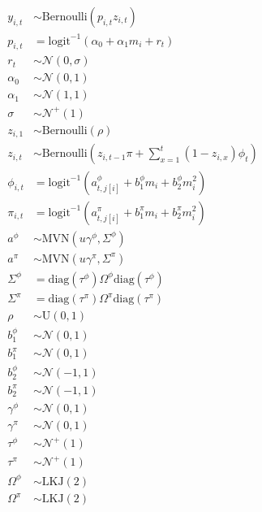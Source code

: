 \documentclass[12pt,letterpaper]{article}
\begin{document}
\begin{equation}
  \begin{aligned}
    y_{i, t} &\sim \text{Bernoulli}(p_{i, t} z_{i, t}) \\
    p_{i, t} &= \text{logit}^{-1}(\alpha_{0} + \alpha_{1} m_{i} + r_{t}) \\ 
    r_{t} &\sim \mathcal{N}(0, \sigma) \\
    \alpha_{0} &\sim \mathcal{N}(0, 1) \\
    \alpha_{1} &\sim \mathcal{N}(1, 1) \\
    \sigma &\sim \mathcal{N}^{+}(1) \\
    z_{i, 1} &\sim \text{Bernoulli}(\rho) \\
    z_{i, t} &\sim \text{Bernoulli}\left(z_{i, t - 1} \pi + \sum_{x = 1}^{t}(1 - z_{i, x}) \phi_{t}\right) \\
    \phi_{i, t} &= \text{logit}^{-1}(a^{\phi}_{t, j[i]} + b^{\phi}_{1} m_{i} + b^{\phi}_{2} m_{i}^{2}) \\
    \pi_{i, t} &= \text{logit}^{-1}(a^{\pi}_{t, j[i]} + b^{\pi}_{1} m_{i} + b^{\pi}_{2} m_{i}^{2}) \\
    a^{\phi} &\sim \text{MVN}(u \gamma^{\phi}, \Sigma^{\phi}) \\
    a^{\pi} &\sim \text{MVN}(u \gamma^{\pi}, \Sigma^{\pi}) \\
    \Sigma^{\phi} &= \text{diag}(\tau^{\phi}) \Omega^{\phi} \text{diag}(\tau^{\phi}) \\
    \Sigma^{\pi} &= \text{diag}(\tau^{\pi}) \Omega^{\pi} \text{diag}(\tau^{\pi}) \\
    \rho &\sim \text{U}(0, 1) \\
    b^{\phi}_{1} &\sim \mathcal{N}(0, 1) \\
    b^{\pi}_{1} &\sim \mathcal{N}(0, 1) \\
    b^{\phi}_{2} &\sim \mathcal{N}(-1, 1) \\
    b^{\pi}_{2} &\sim \mathcal{N}(-1, 1) \\
    \gamma^{\phi} &\sim \mathcal{N}(0, 1) \\
    \gamma^{\pi} &\sim \mathcal{N}(0, 1) \\
    \tau^{\phi} &\sim \mathcal{N}^{+}(1) \\
    \tau^{\pi} &\sim \mathcal{N}^{+}(1) \\
    \Omega^{\phi} &\sim \text{LKJ}(2) \\
    \Omega^{\pi} &\sim \text{LKJ}(2) \\
  \end{aligned}
  \label{eq:birth_death}
\end{equation}
\end{document}
